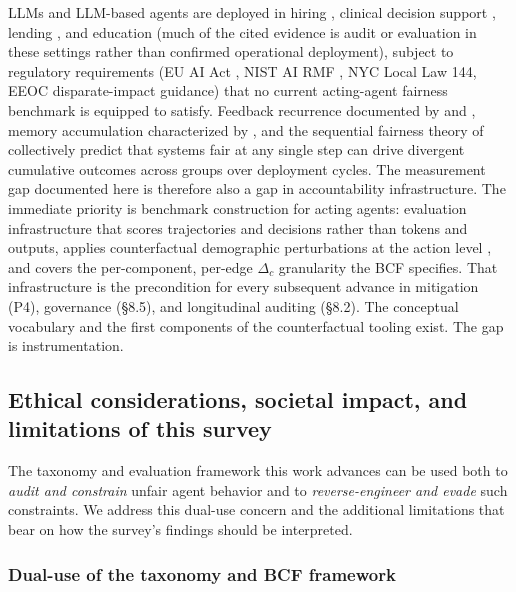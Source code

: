 \documentclass[acmsmall,nonacm]{acmart}
\begin{document}
LLMs and LLM-based agents are deployed in hiring \cite{veldanda2023emily,wilson2024gender,nghiem2024you}, clinical decision support \cite{poulain2024bias,omar2025sociodemographic}, lending \cite{bowen2024measuring,feng2023empowering}, and education \cite{weissburg2024llms} (much of the cited evidence is audit or evaluation in these settings rather than confirmed operational deployment), subject to regulatory requirements (EU AI Act \cite{parliament2024regulation}, NIST AI RMF \cite{nist2023artificial}, NYC Local Law 144, EEOC disparate-impact guidance) that no current acting-agent fairness benchmark is equipped to satisfy. Feedback recurrence documented by \cite{wyllie2024fairness} and \cite{wang2026observations}, memory accumulation characterized by \cite{ma2026implicit}, and the sequential fairness theory of \cite{hu2022achieving,xu2024adapting} collectively predict that systems fair at any single step can drive divergent cumulative outcomes across groups over deployment cycles. The measurement gap documented here is therefore also a gap in accountability infrastructure. The immediate priority is benchmark construction for acting agents: evaluation infrastructure that scores trajectories and decisions rather than tokens and outputs, applies counterfactual demographic perturbations at the action level \cite{parziale2025systematic,amirimargavi2026equal,basu2026names}, and covers the per-component, per-edge $\Delta_c$ granularity the BCF specifies. That infrastructure is the precondition for every subsequent advance in mitigation (P4), governance (\S{}8.5), and longitudinal auditing (\S{}8.2). The conceptual vocabulary and the first components of the counterfactual tooling exist. The gap is instrumentation.


\subsection{Ethical considerations, societal impact, and limitations of this survey}

The taxonomy and evaluation framework this work advances can be used both to \emph{audit and constrain} unfair agent behavior and to \emph{reverse-engineer and evade} such constraints. We address this dual-use concern and the additional limitations that bear on how the survey's findings should be interpreted.

\subsubsection{Dual-use of the taxonomy and BCF framework}
\end{document}
